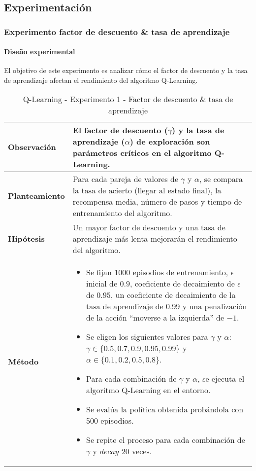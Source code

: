 \subsection{Experimentación}

\subsubsection{Experimento factor de descuento \& tasa de aprendizaje}

\paragraph{Diseño experimental}

El objetivo de este experimento es analizar cómo el factor de descuento y la tasa de aprendizaje afectan el rendimiento del algoritmo Q-Learning.

\begin{table}[H]
    \centering
    \begin{tabularx}{\textwidth}{|p{4cm}|X|} %
        \hline %
        \textbf{Observación} & El factor de descuento ($\gamma$) y la tasa de aprendizaje ($\alpha$) de exploración son parámetros críticos en el algoritmo Q-Learning. 
        \\ \hline 
        \textbf{Planteamiento} & Para cada pareja de valores de $\gamma$ y $\alpha$, se compara la tasa de acierto (llegar al estado final), la recompensa media, número de pasos y tiempo de entrenamiento del algoritmo.
        \\ \hline 
        \textbf{Hipótesis} & Un mayor factor de descuento y una tasa de aprendizaje más lenta mejorarán el rendimiento del algoritmo.
        \\ \hline 
        \textbf{Método} & 
        \begin{itemize}
            \item Se fijan 1000 episodios de entrenamiento, \(\epsilon\) inicial de $0.9$, coeficiente de decaimiento de \(\epsilon\) de $0.95$, un coeficiente de decaimiento de la tasa de aprendizaje de $0.99$ y una penalización de la acción ``moverse a la izquierda'' de $-1$.
            \item Se eligen los siguientes valores para \(\gamma\) y $\alpha$: \(\gamma \in \{0.5, 0.7, 0.9, 0.95, 0.99\}\) y $\alpha \in \{0.1, 0.2, 0.5, 0.8\}$.
            \item Para cada combinación de \(\gamma\) y $\alpha$, se ejecuta el algoritmo Q-Learning en el entorno.
            \item Se evalúa la política obtenida probándola con 500 episodios.
            \item Se repite el proceso para cada combinación de \(\gamma\) y $decay$ 20 veces.
        \end{itemize}
        \\ \hline
    \end{tabularx}
    \caption{Q-Learning - Experimento 1 - Factor de descuento \& tasa de aprendizaje}
    \label{tab:diseñoQLEarningExp1}
\end{table}

